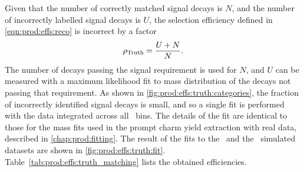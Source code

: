 Given that the number of correctly matched signal decays is $N$, and the number 
of incorrectly labelled signal decays is $U$, the selection efficiency defined 
in \cref{eqn:prod:effs:reco} is incorrect by a factor
\begin{equation}
  \rho_{\textnormal{Truth}} = \frac{U+N}{N}.
  \label{eqn:prod:effs:truth}
\end{equation}
The number of decays passing the signal requirement is used for $N$, and $U$ 
can be measured with a maximum likelihood fit to mass distribution of the 
decays not passing that requirement.
As shown in \cref{fig:prod:effs:truth:categories}, the fraction of incorrectly 
identified signal decays is small, and so a single fit is performed with the 
data integrated across all \pTy\ bins.
The details of the fit are identical to those for the mass fits used in the 
prompt charm yield extraction with real data, described in 
\cref{chap:prod:fitting}.
The result of the fits to the \DzToKpi\ and the \DpToKpipi\ simulated datasets 
are shown in \cref{fig:prod:effs:truth:fit}.
Table~\ref{tab:prod:effs:truth_matching} lists the obtained efficiencies.

